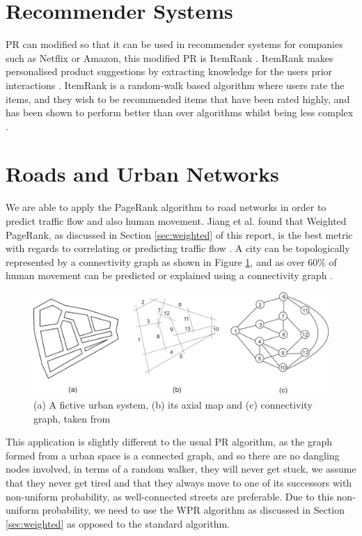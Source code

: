 \documentclass[11pt]{report}
\begin{document}
{\section{Recommender Systems} \label{sec:recommender}
PR can modified so that it can be used in recommender systems for companies such as Netflix or Amazon, this modified PR is ItemRank \cite{gleich2015pagerank}. ItemRank makes personalised product suggestions by extracting knowledge for the users prior interactions \cite{gori2007itemrank}. ItemRank is a random-walk based algorithm where users rate the items, and they wish to be recommended items that have been rated highly, and has been shown to perform better than over algorithms whilst being less complex \cite{gori2007itemrank}.

\section{Roads and Urban Networks} \label{sec:Roads}
We are able to apply the PageRank algorithm to road networks in order to predict traffic flow and also human movement. Jiang et al. found that Weighted PageRank, as discussed in Section \ref{sec:weighted} of this report, is the best metric with regards to correlating or predicting traffic flow \cite{1742-5468-2008-07-P07008}. A city can be topologically represented by a connectivity graph as shown in Figure \ref{fig:city rep}, and as over 60\% of human movement can be predicted or explained using a connectivity graph \cite{doi:10.1080/13658810802022822}.

\begin{figure}[h!]
\centering
\includegraphics[width=\linewidth]{map_view.jpeg}
\caption{(a) A fictive urban system, (b) its axial map and (c) connectivity graph, taken from \cite{doi:10.1080/13658810802022822}}
\label{fig:city rep}
\end{figure}

This application is slightly different to the usual PR algorithm, as the graph formed from a urban space is a connected graph, and so there are no dangling nodes involved, in terms of a random walker, they will never get stuck, we assume that they never get tired and that they always move to one of its successors with non-uniform probability, as well-connected streets are preferable. Due to this non-uniform probability, we need to use the WPR algorithm as discussed in Section \ref{sec:weighted} as opposed to the standard algorithm.

}
\end{document}
